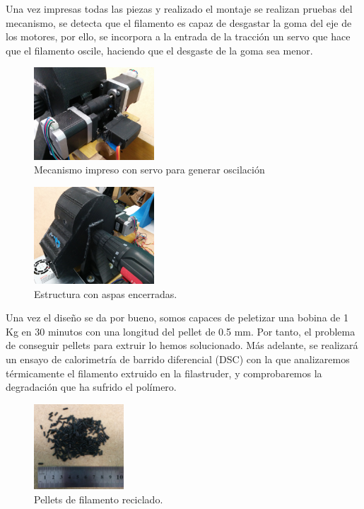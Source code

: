 Una vez impresas todas las piezas y realizado el montaje se realizan pruebas del mecanismo, se detecta que el filamento es capaz de desgastar la goma del eje de los motores, por ello, se incorpora a la entrada de la tracción un servo que hace que el filamento oscile, haciendo que el desgaste de la goma sea menor.

    \begin{figure}[H]
            \centering
            \includegraphics[width=0.4\textwidth]{images/peletizadora/IMG_20150818_172903.jpg}
            \caption{Mecanismo impreso con servo para generar oscilación}
            \label{fig:peletizadora_mecanismo}
    \end{figure}

    \begin{figure}[H]
            \centering
            \includegraphics[width=0.4\textwidth]{images/peletizadora/IMG_20150818_172917.jpg}
            \caption{Estructura con aspas encerradas.}
            \label{fig:peletizadora_mecanismo2}
    \end{figure}

Una vez el diseño se da por bueno, somos capaces de peletizar una bobina de 1 Kg en 30 minutos con una longitud del pellet de 0.5 mm. Por tanto, el problema de conseguir pellets para extruir lo hemos solucionado. Más adelante, se realizará un ensayo de calorimetría de barrido diferencial (DSC) con la que analizaremos térmicamente el filamento extruido en la filastruder, y comprobaremos la degradación que ha sufrido el polímero.
    
    \begin{figure}[H]
            \centering
            \includegraphics[width=0.3\textwidth]{images/peletizadora/IMG_20150819_112740.jpg}
            \caption{Pellets de filamento reciclado.}
            \label{fig:peletizadora_pellets_reciclados}
    \end{figure}
